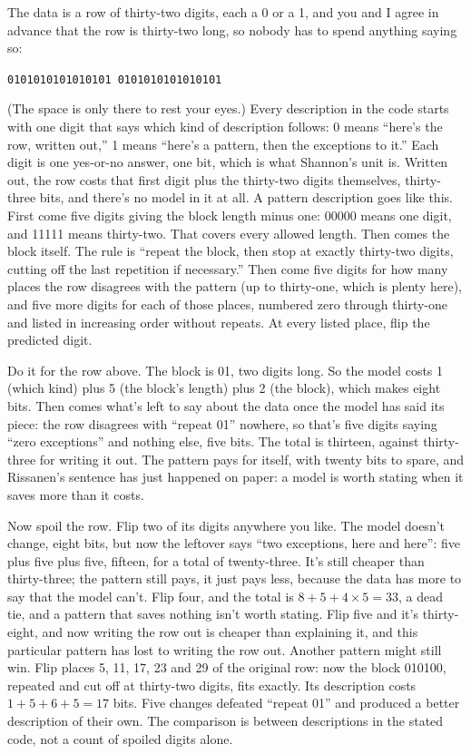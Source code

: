 \documentclass[11pt,twoside]{article}
\theoremstyle{thielethm}
\theoremstyle{thieledef}
\theoremstyle{thieledef}
\theoremstyle{thieledef}
\theoremstyle{thielethm}
\theoremstyle{thieleobs}
\theoremstyle{thielethm}
\begin{document}
The data is a row of thirty-two digits, each a 0 or a 1, and you and I agree in advance that the row is thirty-two long, so nobody has to spend anything saying so:

\begin{center}\texttt{0101010101010101 0101010101010101}\end{center}

(The space is only there to rest your eyes.) Every description in the code starts with one digit that says which kind of description follows: 0 means ``here's the row, written out,'' 1 means ``here's a pattern, then the exceptions to it.'' Each digit is one yes-or-no answer, one bit, which is what Shannon's unit is. Written out, the row costs that first digit plus the thirty-two digits themselves, thirty-three bits, and there's no model in it at all. A pattern description goes like this. First come five digits giving the block length minus one: 00000 means one digit, and 11111 means thirty-two. That covers every allowed length. Then comes the block itself. The rule is ``repeat the block, then stop at exactly thirty-two digits, cutting off the last repetition if necessary.'' Then come five digits for how many places the row disagrees with the pattern (up to thirty-one, which is plenty here), and five more digits for each of those places, numbered zero through thirty-one and listed in increasing order without repeats. At every listed place, flip the predicted digit.

Do it for the row above. The block is 01, two digits long. So the model costs 1 (which kind) plus 5 (the block's length) plus 2 (the block), which makes eight bits. Then comes what's left to say about the data once the model has said its piece: the row disagrees with ``repeat 01'' nowhere, so that's five digits saying ``zero exceptions'' and nothing else, five bits. The total is thirteen, against thirty-three for writing it out. The pattern pays for itself, with twenty bits to spare, and Rissanen's sentence has just happened on paper: a model is worth stating when it saves more than it costs.

Now spoil the row. Flip two of its digits anywhere you like. The model doesn't change, eight bits, but now the leftover says ``two exceptions, here and here'': five plus five plus five, fifteen, for a total of twenty-three. It's still cheaper than thirty-three; the pattern still pays, it just pays less, because the data has more to say that the model can't. Flip four, and the total is $8 + 5 + 4 \times 5 = 33$, a dead tie, and a pattern that saves nothing isn't worth stating. Flip five and it's thirty-eight, and now writing the row out is cheaper than explaining it, and this particular pattern has lost to writing the row out. Another pattern might still win. Flip places 5, 11, 17, 23 and 29 of the original row: now the block 010100, repeated and cut off at thirty-two digits, fits exactly. Its description costs $1+5+6+5=17$ bits. Five changes defeated ``repeat 01'' and produced a better description of their own. The comparison is between descriptions in the stated code, not a count of spoiled digits alone.
\end{document}
